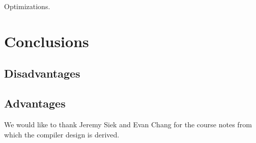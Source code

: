 \documentclass{sigplanconf}
\begin{document}
Optimizations.

\section{Conclusions}
\label{sec:conclusion}

\subsection{Disadvantages}

\subsection{Advantages}


\acks

We would like to thank Jeremy Siek and Evan Chang for the course notes from which the compiler design is derived.




\end{document}
